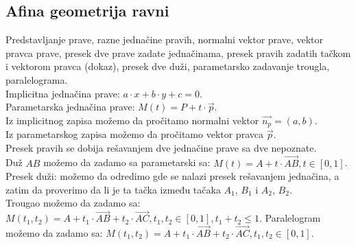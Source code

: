\documentclass[12pt]{article}
\newcommand{\vek}[1]{\overrightarrow{#1}}
\begin{document}
    \subsection{Afina geometrija ravni}
    Predstavljanje prave, razne jednačine pravih, normalni
    vektor prave, vektor pravca prave, presek dve prave zadate
    jednačinama, presek pravih zadatih tačkom i vektorom pravca
    (dokaz), presek dve duži, parametarsko zadavanje trougla,
    paralelograma.
    \\[1cm]
    Implicitna jednačina prave: $a\cdot x+b\cdot y + c = 0$.\\
    Parametarska jednačina prave: $M(t)=P+t\cdot \vek{p}$.\\
    Iz implicitnog zapisa možemo da pročitamo normalni vektor $\vek{n_p}=(a,b)$.\\
    Iz parametarskog zapisa možemo da pročitamo vektor pravca $\vek{p}$.\\
    Presek pravih se dobija rešavanjem dve jednačine prave sa dve nepoznate.\\
    Duž $AB$ možemo da zadamo sa parametarski sa: $M(t)=A+t\cdot \vek{AB}, t\in[0,1]$.\\
    Presek duži: možemo da odredimo gde se nalazi presek rešavanjem jednačina,
    a zatim da proverimo da li je ta tačka između tačaka $A_1$, $B_1$ i $A_2$, $B_2$.\\
    Trougao možemo da zadamo sa: $M(t_1,t_2)=A+t_1\cdot \vek{AB}+t_2\cdot \vek{AC}, t_1, t_2\in[0,1], t_1+t_2\leq1$.
    Paralelogram možemo da zadamo sa: $M(t_1,t_2)=A+t_1\cdot \vek{AB}+t_2\cdot \vek{AC}, t_1, t_2\in[0,1]$.
    \par
\end{document}
